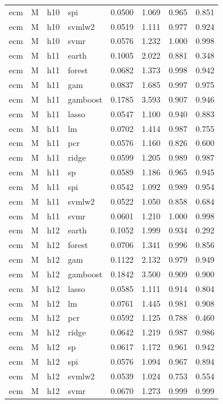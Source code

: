 \begin{ThreePartTable}
\begin{longtable}[t]{llclcccc}
ecm & M & h10 & spi & 0.0500 & 1.069 & 0.965 & 0.851\\
ecm & M & h10 & svmlw2 & 0.0519 & 1.111 & 0.977 & 0.924\\
ecm & M & h10 & svmr & 0.0576 & 1.232 & 1.000 & 0.998\\
\addlinespace
ecm & M & h11 & earth & 0.1005 & 2.022 & 0.881 & 0.348\\
ecm & M & h11 & forest & 0.0682 & 1.373 & 0.998 & 0.942\\
ecm & M & h11 & gam & 0.0837 & 1.685 & 0.997 & 0.975\\
ecm & M & h11 & gamboost & 0.1785 & 3.593 & 0.907 & 0.946\\
ecm & M & h11 & lasso & 0.0547 & 1.100 & 0.940 & 0.883\\
ecm & M & h11 & lm & 0.0702 & 1.414 & 0.987 & 0.755\\
ecm & M & h11 & pcr & 0.0576 & 1.160 & 0.826 & 0.600\\
ecm & M & h11 & ridge & 0.0599 & 1.205 & 0.989 & 0.987\\
ecm & M & h11 & sp & 0.0589 & 1.186 & 0.965 & 0.945\\
ecm & M & h11 & spi & 0.0542 & 1.092 & 0.989 & 0.954\\
ecm & M & h11 & svmlw2 & 0.0522 & 1.050 & 0.858 & 0.684\\
ecm & M & h11 & svmr & 0.0601 & 1.210 & 1.000 & 0.998\\
\addlinespace
ecm & M & h12 & earth & 0.1052 & 1.999 & 0.934 & 0.292\\
ecm & M & h12 & forest & 0.0706 & 1.341 & 0.996 & 0.856\\
ecm & M & h12 & gam & 0.1122 & 2.132 & 0.979 & 0.949\\
ecm & M & h12 & gamboost & 0.1842 & 3.500 & 0.909 & 0.900\\
ecm & M & h12 & lasso & 0.0585 & 1.111 & 0.914 & 0.804\\
ecm & M & h12 & lm & 0.0761 & 1.445 & 0.981 & 0.908\\
ecm & M & h12 & pcr & 0.0592 & 1.125 & 0.788 & 0.460\\
ecm & M & h12 & ridge & 0.0642 & 1.219 & 0.987 & 0.986\\
ecm & M & h12 & sp & 0.0617 & 1.172 & 0.961 & 0.942\\
ecm & M & h12 & spi & 0.0576 & 1.094 & 0.967 & 0.894\\
ecm & M & h12 & svmlw2 & 0.0539 & 1.024 & 0.753 & 0.554\\
ecm & M & h12 & svmr & 0.0670 & 1.273 & 0.999 & 0.999\\

\end{longtable}
\end{ThreePartTable}
